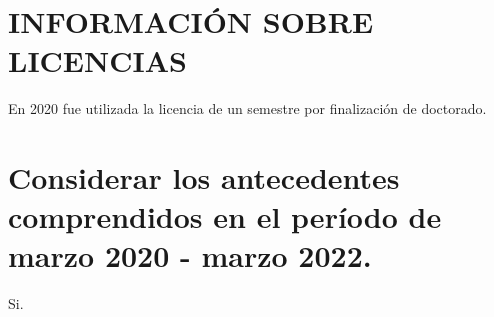 \documentclass[a4paper,10pt]{article}
\begin{document}
\section{INFORMACIÓN SOBRE LICENCIAS}

En 2020 fue utilizada la licencia de un semestre por finalización de doctorado.

\section{Considerar los antecedentes comprendidos en el período de marzo 2020 -
marzo 2022.}

Si.
\end{document}
